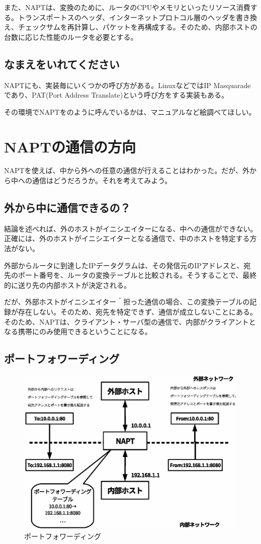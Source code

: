 また、NAPTは、変換のために、ルータのCPUやメモリといったリソース消費する。トランスポートスのヘッダ、インターネットプロトコル層のヘッダを書き換え、チェックサムを再計算し、パケットを再構成する。そのため、内部ホストの台数に応じた性能のルータを必要とする。


\subsection{なまえをいれてください}
NAPTにも、実装毎にいくつかの呼び方がある。LinuxなどではIP Masquaradeであり、PAT(Port Address Translate)という呼び方をする実装もある。

その環境でNAPTをのように呼んでいるかは、マニュアルなど絵調べてほしい。

\section{NAPTの通信の方向}

NAPTを使えば、中から外への任意の通信が行えることはわかった。だが、外から中への通信はどうだろうか。それを考えてみよう。

\subsection{外から中に通信できるの？}
結論を述べれば、外のホストがイニシエイターになる、中への通信ができない。正確には、外のホストがイニシエイターとなる通信で、中のホストを特定する方法がない。

外部からルータに到達したIPデータグラムは、その発信元のIPアドレスと、宛先のポート番号を、ルータの変換テーブルと比較される。そうすることで、最終的に送り先の内部ホストが決定される。

だが、外部ホストがイニシエイター＾担った通信の場合、この変換テーブルの記録が存在しない。そのため、宛先を特定できず、通信が成立しないことにある。そのため、NAPTは、クライアント・サーバ型の通信で、内部がクライアントとなる携帯にのみ使用できるということになる。

\subsection{ポートフォワーディング}

\begin{figure}[htbp]
	\includegraphics[width=12cm,clip]{draw/fig10.eps}
	\caption{ポートフォワーディング}
	\label{fig:port-forward}
\end{figure}

